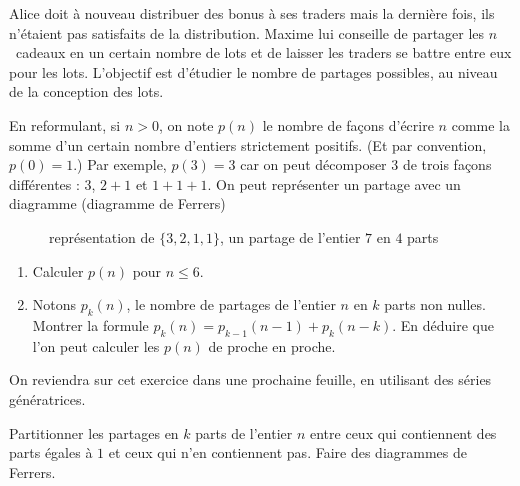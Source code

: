 \begin{exo}
Alice doit à nouveau distribuer des bonus à ses traders mais la dernière fois, ils n'étaient pas satisfaits de la distribution. Maxime lui conseille de partager les $n$~cadeaux en un certain nombre de lots et de laisser les traders se battre entre eux pour les lots. L'objectif est d'étudier le nombre de partages possibles, au niveau de la conception des lots.

En reformulant, si $n>0$, on note $p(n)$ le nombre de  façons d'écrire $n$ comme la somme d'un certain nombre d'entiers strictement positifs. (Et par convention, $p(0)=1$.) Par exemple, $p(3)=3$ car on peut décomposer $3$ de trois façons différentes : $3$, $2+1$ et $1+1+1$. On peut représenter un partage avec un diagramme (diagramme de Ferrers)

\begin{figure}[h!]
\begin{center}
\caption{représentation de $\{3,2,1,1\}$, un  partage de l'entier $7$ en $4$ parts}
\end{center}
\end{figure}




\begin{enumerate}
\item Calculer $p(n)$ pour $n\leq 6$.%
\item Notons $p_k(n)$, le nombre de partages de l'entier $n$ en $k$ parts non nulles. Montrer la formule $p_k(n)=p_{k-1}(n-1)+p_k(n-k)$.
En déduire que l'on peut calculer les $p(n)$ de proche en proche. 
\end{enumerate}
On reviendra sur cet exercice dans une prochaine feuille, en utilisant des séries génératrices.

\begin{hint} %
Partitionner les partages en $k$ parts de l'entier $n$ entre ceux qui contiennent des parts égales à $1$ et ceux qui n'en contiennent pas. 
Faire des diagrammes de Ferrers. 
\end{hint}


\end{exo}
